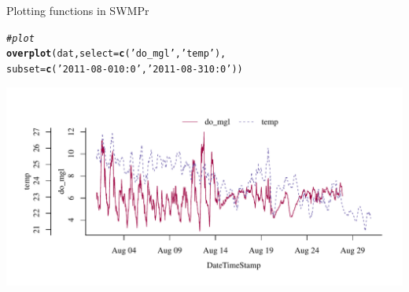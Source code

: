 \documentclass[xcolor=dvipsnames]{beamer}\usepackage[]{graphicx}\usepackage[]{color}
\makeatletter
\newcommand{\hlstr}[1]{\textcolor[rgb]{0.192,0.494,0.8}{#1}}%
\newcommand{\hlcom}[1]{\textcolor[rgb]{0.678,0.584,0.686}{\textit{#1}}}%
\newcommand{\hlstd}[1]{\textcolor[rgb]{0.345,0.345,0.345}{#1}}%
\newcommand{\hlkwc}[1]{\textcolor[rgb]{0.333,0.667,0.333}{#1}}%
\newcommand{\hlkwd}[1]{\textcolor[rgb]{0.737,0.353,0.396}{\textbf{#1}}}%
\newenvironment{kframe}{%
 \def\at@end@of@kframe{}%
 \ifinner\ifhmode%
  \def\at@end@of@kframe{\end{minipage}}%
  \begin{minipage}{\columnwidth}%
 \fi\fi%
 \def\FrameCommand##1{\hskip\@totalleftmargin \hskip-\fboxsep
 \colorbox{shadecolor}{##1}\hskip-\fboxsep
     \hskip-\linewidth \hskip-\@totalleftmargin \hskip\columnwidth}%
 \MakeFramed {\advance\hsize-\width
   \@totalleftmargin\z@ \linewidth\hsize
   \@setminipage}}%
 {\par\unskip\endMakeFramed%
 \at@end@of@kframe}
\newenvironment{knitrout}{}{} %
\makeatother
\begin{document}
\begin{frame}[fragile, t]{Plotting functions in SWMPr}
\begin{knitrout}\scriptsize
{}\color{fgcolor}\begin{kframe}
\begin{alltt}
\hlcom{# plot}
\hlkwd{overplot}\hlstd{(dat,} \hlkwc{select} \hlstd{=} \hlkwd{c}\hlstd{(}\hlstr{'do_mgl'}\hlstd{,} \hlstr{'temp'}\hlstd{),}
  \hlkwc{subset} \hlstd{=} \hlkwd{c}\hlstd{(}\hlstr{'2011-08-01 0:0'}\hlstd{,} \hlstr{'2011-08-31 0:0'}\hlstd{))}
\end{alltt}
\end{kframe}

{\centering \includegraphics[width=\textwidth]{figure/unnamed-chunk-29-1} 

}



\end{knitrout}
\end{frame}
\end{document}
